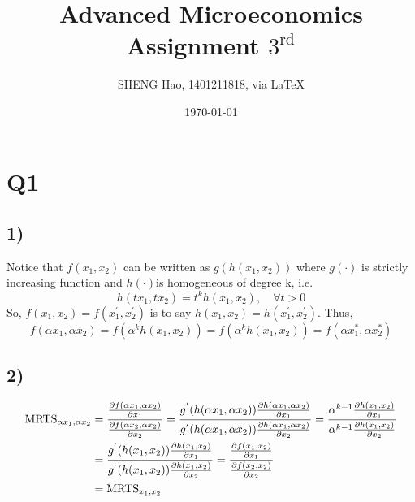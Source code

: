 \documentclass{article}
\begin{document}
\title{Advanced Microeconomics\\Assignment $3^{\text{rd}}$}
\author{{\normalsize SHENG Hao, 1401211818, via \LaTeX}}
\date{\today}

\maketitle

\def \Pr{{\rm Pr}}
\baselineskip 0.6cm
\section*{Q1}
\subsection*{1)}
Notice that $f(x_1,x_2)$ can be written as $g(h(x_1,x_2))$ where $g(\cdot)$ is strictly increasing function and $h(\cdot)$is homogeneous of degree k, i.e.
\begin{equation}
	h(tx_1,tx_2) = t^kh(x_1,x_2),\quad \forall t>0
\end{equation}
So, $f(x_1,x_2) = f(x^{'}_1,x^{'}_2)$ is to say $h(x_1,x_2) = h(x^{'}_1,x^{'}_2)$. Thus,
\begin{equation}
	f(\alpha x_1, \alpha x_2) = f(\alpha^k h(x_1,x_2))=f(\alpha^k h(x_1,x_2)) = f(\alpha x^{*}_1, \alpha x^{*}_2)
\end{equation}
\rightline{$\blacksquare$}

\subsection*{2)}
\begin{align}\notag
	\text{MRTS}_{\alpha x_1,\alpha x_2} &= \frac{\frac{\partial f(\alpha x_1, \alpha x_2)}{\partial x_1}}{\frac{\partial f(\alpha x_2, \alpha x_2)}{\partial x_2}}
	= \frac{g^{'}(h(\alpha x_1, \alpha x_2))\frac{\partial h(\alpha x_1, \alpha x_2)}{\partial x_1}}{g^{'}(h(\alpha x_1, \alpha x_2))\frac{\partial h(\alpha x_1, \alpha x_2)}{\partial x_2}} 
	= \frac{\alpha^{k-1} \frac{\partial h(x_1, x_2)}{\partial x_1}}{\alpha^{k-1} \frac{\partial h(x_1, x_2)}{\partial x_2}}\\ \notag
	&=\frac{g^{'}(h( x_1,  x_2))\frac{\partial h( x_1,  x_2)}{\partial x_1}}{g^{'}(h( x_1,  x_2))\frac{\partial h( x_1,  x_2)}{\partial x_2}}
	= \frac{\frac{\partial f( x_1,  x_2)}{\partial x_1}}{\frac{\partial f( x_2,  x_2)}{\partial x_2}} \\ \notag
	&= \text{MRTS}_{ x_1, x_2} 
\end{align}
\rightline{$\blacksquare$}
\end{document}
